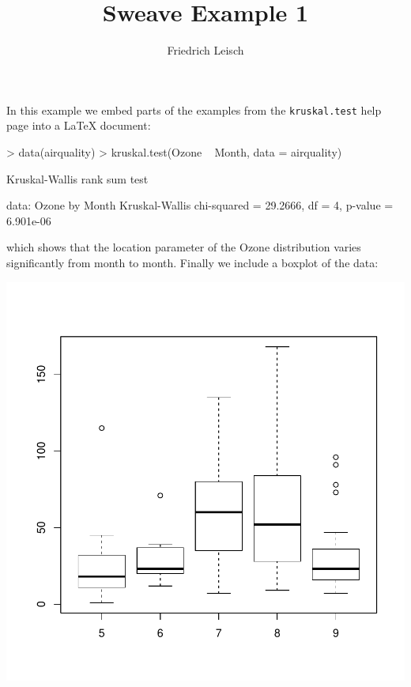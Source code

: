 \documentclass[a4paper]{article}
\title{Sweave Example 1}
\author{Friedrich Leisch}
\begin{document}
\maketitle
In this example we embed parts of the examples from the
\texttt{kruskal.test} help page into a \LaTeX{} document:
\begin{Schunk}
\begin{Sinput}
> data(airquality)
> kruskal.test(Ozone ~ Month, data = airquality)
\end{Sinput}
\begin{Soutput}
	Kruskal-Wallis rank sum test

data:  Ozone by Month 
Kruskal-Wallis chi-squared = 29.2666, df = 4, p-value = 6.901e-06
\end{Soutput}
\end{Schunk}
which shows that the location parameter of the Ozone
distribution varies significantly from month to month.  Finally we
include a boxplot of the data:
\begin{center}
\includegraphics{simple-002}
\end{center}
\end{document}
